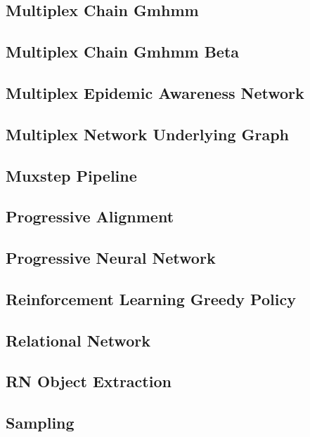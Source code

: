 \documentclass{article}
\newcommand{\example}[1]{
\resizebox{\linewidth}{!}{

}

}
\begin{document}
\subsection{Multiplex Chain Gmhmm}
\example{multiplex_chain_gmhmm}
\subsection{Multiplex Chain Gmhmm Beta}
\example{multiplex_chain_gmhmm_beta}
\subsection{Multiplex Epidemic Awareness Network}
\example{multiplex_epidemics-awareness_network}
\subsection{Multiplex Network Underlying Graph}
\example{multiplex_network_underlying_graph}
\subsection{Muxstep Pipeline}
\example{muxstep_pipeline}
\subsection{Progressive Alignment}
\example{progressive_alignment}
\subsection{Progressive Neural Network}
\example{progressive_neural_network}
\subsection{Reinforcement Learning Greedy Policy}
\example{reinforcement_learning_greedy_policy}
\subsection{Relational Network}
\example{relational_network}
\subsection{RN Object Extraction}
\example{rn_object_extraction}
\subsection{Sampling}
\example{sampling}
\end{document}
